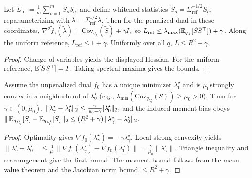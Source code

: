 \begin{lemma}\label{lem:refwhiten}
Let $\Sigma_{\mathrm{ref}}=\frac{1}{m}\sum_{o=1}^m S_o S_o^\top$ and define whitened statistics $\tilde S_o=\Sigma_{\mathrm{ref}}^{-1/2}S_o$, reparameterizing with $\tilde\lambda=\Sigma_{\mathrm{ref}}^{1/2}\lambda$. Then for the penalized dual in these coordinates,
$
\nabla^2 \tilde f_\gamma(\tilde\lambda)=\mathrm{Cov}_{q_{\tilde\lambda}}(\tilde S)+\gamma I,
$
so $L_{\mathrm{ref}}\le \lambda_{\max}(\mathbb{E}_{q_{\tilde\lambda}}[\tilde S\tilde S^\top])+\gamma$. Along the uniform reference, $L_{\mathrm{ref}}\le 1+\gamma$. Uniformly over all $q$, $L\le R^2+\gamma$.
\end{lemma}
\begin{proof}
Change of variables yields the displayed Hessian. For the uniform reference, $\mathbb{E}[\tilde S\tilde S^\top]=I$. Taking spectral maxima gives the bounds.
\end{proof}

\begin{lemma}\label{lem:penalty-bias}
Assume the unpenalized dual $f_0$ has a unique minimizer $\lambda^\star_0$ and is $\mu_0$\textendash strongly convex in a neighborhood of $\lambda^\star_0$ (e.g., $\lambda_{\min}(\mathrm{Cov}_{q_{\lambda^\star_0}}(S))\ge \mu_0>0$). Then for $\gamma\in(0,\mu_0)$,
$
\|\lambda^\star_\gamma-\lambda^\star_0\|_2\le \frac{\gamma}{\mu_0-\gamma}\,\\|\lambda^\star_0\|_2,
$
and the induced moment bias obeys
$
\|\,\mathbb{E}_{q_{\lambda^\star_\gamma}}[S]-\mathbb{E}_{q_{\lambda^\star_0}}[S]\,\|_2 \le (R^2+\gamma)\,\|\lambda^\star_\gamma-\lambda^\star_0\|_2.
$
\end{lemma}
\begin{proof}
Optimality gives $\nabla f_0(\lambda^\star_\gamma)=-\gamma\lambda^\star_\gamma$. Local strong convexity yields
$
\|\lambda^\star_\gamma-\lambda^\star_0\|\le \frac{1}{\mu_0}\|\nabla f_0(\lambda^\star_\gamma)-\nabla f_0(\lambda^\star_0)\|= \frac{\gamma}{\mu_0}\|\lambda^\star_\gamma\|.
$
Triangle inequality and rearrangement give the first bound. The moment bound follows from the mean value theorem and the Jacobian norm bound $\le R^2+\gamma$.
\end{proof}

